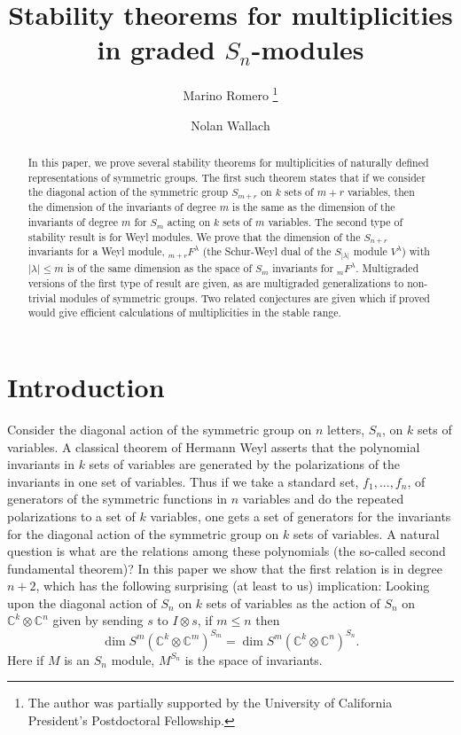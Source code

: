 \documentclass[12pt]{article}%
\begin{document}
\title{Stability theorems for multiplicities in graded $S_n$-modules}
\author{Marino Romero \thanks{The author was partially supported by the University of
California President's Postdoctoral Fellowship. }
\and Nolan Wallach}
\maketitle

\begin{abstract}
In this paper, we prove several stability theorems for multiplicities of naturally
defined representations of symmetric groups. The first such theorem states
that if we consider the diagonal action of the symmetric group
$S_{m+r}$ on $k$ sets of $m+r$ variables, then the dimension of the invariants of
degree $m$ is the same as the dimension of the invariants of degree $m$ for
$S_{m}$ acting on $k$ sets of $m$ variables. The second type of stability
result is for Weyl modules. We prove that the dimension of the $S_{n+r}$
invariants for a Weyl module, ${}_{m+r}F^{\lambda}$ (the Schur-Weyl dual of the
$S_{|\lambda|}$ module $V^{\lambda}$) with $\left\vert \lambda \right\vert  \leq
m$ is of the same dimension as the space of $S_{m}$ invariants for
${}_{m}F^{\lambda}$. Multigraded versions of the first type of result are given, as
are multigraded generalizations to non-trivial modules of symmetric groups.
Two related conjectures are given which if proved would give efficient
calculations of multiplicities in the stable range.

\end{abstract}

\section{Introduction}

Consider the diagonal action of the symmetric group on $n$ letters, $S_{n}$,
on $k$ sets of variables. A classical theorem of Hermann Weyl asserts that the
polynomial invariants in $k$ sets of variables are generated by the
polarizations of the invariants in one set of variables. Thus if we take a
standard set, $f_{1},...,f_{n}$, of generators of the symmetric functions in
$n$ variables and do the repeated polarizations to a set of $k$ variables, one
gets a set of generators for the invariants for the diagonal action of the
symmetric group on $k$ sets of variables. A natural question is what are the
relations among these polynomials (the so-called second fundamental theorem)?
In this paper we show that the first relation is in degree $n+2$, which has
the following surprising (at least to us) implication: Looking upon the
diagonal action of $S_{n}$ on $k$ sets of variables as the action of $S_{n}$
on $\mathbb{C}^{k}\otimes\mathbb{C}^{n}$ given by sending $s$ to $I\otimes s$,
if $m\leq n$ then%
\[
\dim S^{m}(\mathbb{C}^{k}\otimes\mathbb{C}^{m})^{S_{m}}=\dim S^{m}%
(\mathbb{C}^{k}\otimes\mathbb{C}^{n})^{S_{n}}.
\]
Here if $M$ is an $S_{n}$ module, $M^{S_{n}}$ is the space of invariants.
\end{document}

